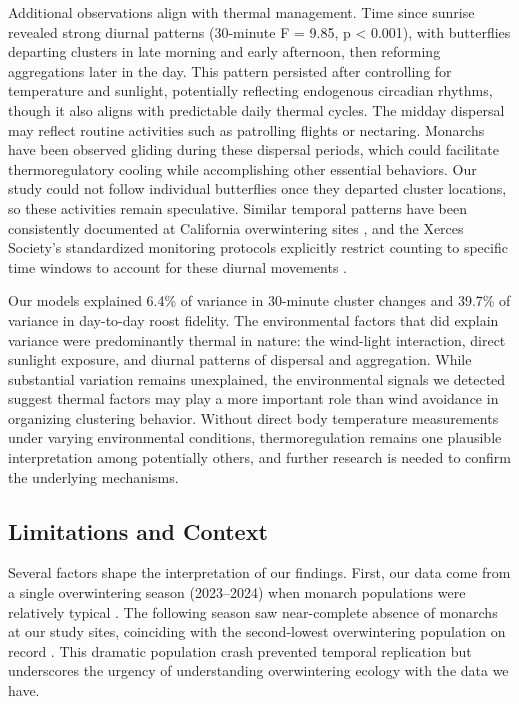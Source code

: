 Additional observations align with thermal management. Time since sunrise revealed strong diurnal patterns (30-minute F = 9.85, p < 0.001), with butterflies departing clusters in late morning and early afternoon, then reforming aggregations later in the day. This pattern persisted after controlling for temperature and sunlight, potentially reflecting endogenous circadian rhythms, though it also aligns with predictable daily thermal cycles. The midday dispersal may reflect routine activities such as patrolling flights or nectaring. Monarchs have been observed gliding during these dispersal periods, which could facilitate thermoregulatory cooling while accomplishing other essential behaviors. Our study could not follow individual butterflies once they departed cluster locations, so these activities remain speculative. Similar temporal patterns have been consistently documented at California overwintering sites \parencite{tuskesOverwinteringEcologyMonarch1978,chaplinEnergyReservesMetabolic1982}, and the Xerces Society's standardized monitoring protocols explicitly restrict counting to specific time windows to account for these diurnal movements \parencite{xercessocietyStepbyStepWesternMonarch2017}.

Our models explained 6.4\% of variance in 30-minute cluster changes and 39.7\% of variance in day-to-day roost fidelity. The environmental factors that did explain variance were predominantly thermal in nature: the wind-light interaction, direct sunlight exposure, and diurnal patterns of dispersal and aggregation. While substantial variation remains unexplained, the environmental signals we detected suggest thermal factors may play a more important role than wind avoidance in organizing clustering behavior. Without direct body temperature measurements under varying environmental conditions, thermoregulation remains one plausible interpretation among potentially others, and further research is needed to confirm the underlying mechanisms.

\subsection{Limitations and Context}

Several factors shape the interpretation of our findings. First, our data come from a single overwintering season (2023--2024) when monarch populations were relatively typical \parencite{xercessocietyWesternMonarchThanksgiving2025}. The following season saw near-complete absence of monarchs at our study sites, coinciding with the second-lowest overwintering population on record \parencite{xercessocietyWesternMonarchButterfly2025}. This dramatic population crash prevented temporal replication but underscores the urgency of understanding overwintering ecology with the data we have.


